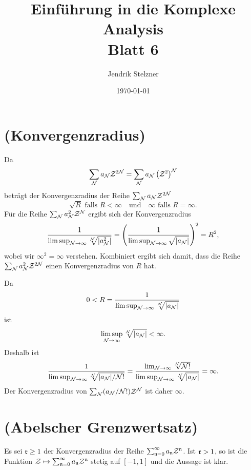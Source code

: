 \documentclass[a4paper,10pt]{article}
\title{Einführung in die Komplexe Analysis \\ \Large Blatt 6}
\author{Jendrik Stelzner}
\date{\today}
\begin{document}
\maketitle





\section{(Konvergenzradius)}
Da
\[
 \sum_{\mathcal{N}} a_{\mathcal{N}} \mathcal{Z}^{2\mathcal{N}}
 = \sum_{\mathcal{N}} a_{\mathcal{N}} \left(\mathcal{Z}^2\right)^{\mathcal{N}}
\]
beträgt der Konvergenzradius der Reihe $\sum_{\mathcal{N}} a_{\mathcal{N}} \mathcal{Z}^{2\mathcal{N}}$
\[
 \sqrt{R} \text{ falls } R < \infty \quad \text{und} \quad \infty \text{ falls } R = \infty.
\]
Für die Reihe $\sum_{\mathcal{N}} a_{\mathcal{N}}^2 \mathcal{Z}^{\mathcal{N}}$ ergibt sich der Konvergenzradius
\[
 \frac{1}{\limsup_{\mathcal{N} \to \infty} \sqrt[\mathcal{N}]{|a_{\mathcal{N}}^2|}}
 = \left( \frac{1}{\limsup_{\mathcal{N} \to \infty} \sqrt{|a_{\mathcal{N}}|}} \right)^2
 = R^2,
\]
wobei wir $\infty^2 = \infty$ verstehen. Kombiniert ergibt sich damit, dass die Reihe $\sum_{\mathcal{N}} a_{\mathcal{N}}^2 \mathcal{Z}^{2\mathcal{N}}$ einen Konvergenzradius von $R$ hat.

Da
\[
 0 < R = \frac{1}{\limsup_{\mathcal{N} \to \infty} \sqrt[\mathcal{N}]{|a_{\mathcal{N}}|}}
\]
ist
\[
 \limsup_{\mathcal{N} \to \infty} \sqrt[\mathcal{N}]{|a_{\mathcal{N}}|} < \infty.
\]
Deshalb ist
\[
 \frac{1}{\limsup_{\mathcal{N} \to \infty} \sqrt[\mathcal{N}]{|a_{\mathcal{N}}|/\mathcal{N}!}}
 = \frac{\lim_{\mathcal{N} \to \infty} \sqrt[\mathcal{N}]{\mathcal{N}!}}{\limsup_{\mathcal{N} \to \infty} \sqrt[\mathcal{N}]{|a_{\mathcal{N}}|}}
 = \infty.
\]
Der Konvergenzradius von $\sum_{\mathcal{N}} (a_{\mathcal{N}}/\mathcal{N}!) \mathcal{Z}^{\mathcal{N}}$ ist daher $\infty$.





\section{(Abelscher Grenzwertsatz)}
Es sei $\mathfrak{r} \geq 1$ der Konvergenzradius der Reihe $\sum_{\mathfrak{n}=0}^\infty a_\mathfrak{n} \mathcal{Z}^\mathfrak{n}$. Ist $\mathfrak{r} > 1$, so ist die Funktion $\mathcal{Z} \mapsto \sum_{\mathfrak{n}=0}^\infty a_\mathfrak{n} \mathcal{Z}^\mathfrak{n}$ stetig auf $[-1,1]$ und die Aussage ist klar.
\end{document}
